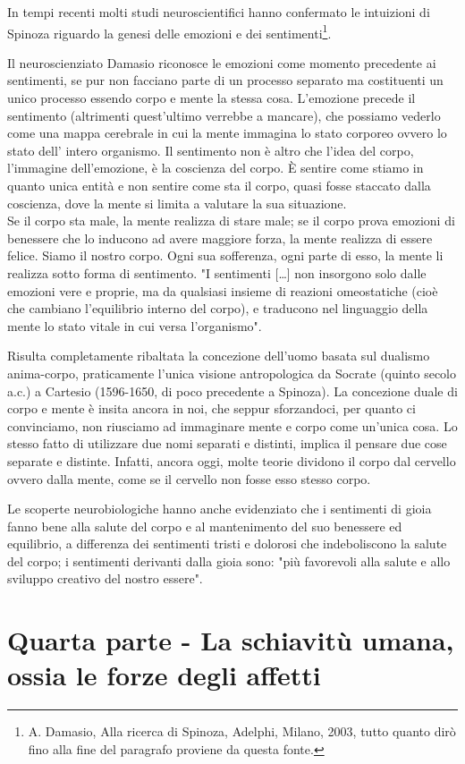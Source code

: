 In tempi recenti molti studi neuroscientifici hanno confermato le intuizioni di Spinoza riguardo la genesi delle emozioni e dei sentimenti\footnote{A. Damasio, Alla ricerca di Spinoza, Adelphi, Milano, 2003, tutto quanto dirò fino alla fine del paragrafo proviene da questa fonte.}.

Il neuroscienziato Damasio riconosce le emozioni come momento precedente ai sentimenti, se pur non facciano parte di un processo separato ma costituenti un unico processo essendo
corpo e mente la stessa cosa. L'emozione precede
il sentimento (altrimenti quest'ultimo verrebbe a mancare), che possiamo vederlo come una mappa cerebrale in cui la mente immagina lo stato corporeo ovvero lo stato dell’ intero organismo. Il sentimento non è altro che l’idea del
corpo, l’immagine dell’emozione, è la coscienza del corpo. È sentire come stiamo in quanto unica entità e non sentire come sta il corpo, quasi fosse staccato dalla coscienza, dove la mente si limita a valutare la sua situazione. \\
Se il corpo sta male, la mente realizza di stare male; se il corpo prova
emozioni di benessere che lo inducono ad avere maggiore forza, la mente realizza di
essere felice. Siamo il nostro corpo. Ogni
sua sofferenza, ogni parte di esso, la mente li realizza sotto forma di sentimento. "I sentimenti […] non insorgono solo dalle emozioni vere e proprie, ma da qualsiasi insieme di
reazioni omeostatiche (cioè che cambiano l'equilibrio interno del corpo), e traducono nel linguaggio della mente lo stato vitale in cui versa
l’organismo".

Risulta completamente ribaltata la concezione dell'uomo basata sul dualismo anima-corpo, praticamente l'unica visione antropologica da Socrate (quinto secolo a.c.) a Cartesio (1596-1650, di poco precedente a Spinoza). La concezione duale di corpo e mente è insita ancora in noi, che seppur sforzandoci,
per quanto ci convinciamo, non riusciamo ad immaginare mente e corpo come un'unica
cosa. Lo stesso fatto di utilizzare due nomi separati e distinti, implica il pensare due
cose separate e distinte. Infatti, ancora oggi, molte teorie dividono il corpo dal cervello
ovvero dalla mente, come se il cervello non fosse esso stesso corpo. 

Le scoperte neurobiologiche hanno anche
evidenziato che i sentimenti di gioia fanno bene alla salute del corpo e al mantenimento del suo benessere ed
equilibrio, a differenza dei sentimenti tristi e dolorosi che indeboliscono la salute del
corpo; i sentimenti derivanti dalla gioia sono: "più favorevoli
alla salute e allo sviluppo creativo del nostro essere".
\newpage

\section{Quarta parte - La schiavitù umana, ossia le forze degli affetti}


